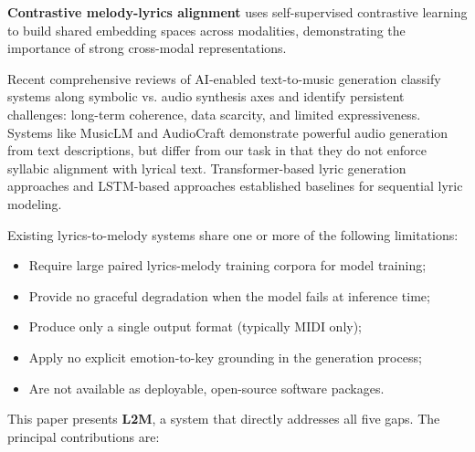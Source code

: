 \documentclass[conference]{IEEEtran}
\begin{document}
\textbf{Contrastive melody-lyrics alignment} \cite{wang2025} uses
self-supervised contrastive learning to build shared embedding spaces across
modalities, demonstrating the importance of strong cross-modal representations.

Recent comprehensive reviews of AI-enabled text-to-music generation \cite{li2025}
classify systems along symbolic vs. audio synthesis axes and identify persistent
challenges: long-term coherence, data scarcity, and limited expressiveness.
Systems like MusicLM and AudioCraft demonstrate powerful audio generation from
text descriptions, but differ from our task in that they do not enforce
syllabic alignment with lyrical text. Transformer-based lyric generation
approaches \cite{mediakov2024} and LSTM-based approaches \cite{gill2020}
established baselines for sequential lyric modeling.

Existing lyrics-to-melody systems share one or more of the following
limitations:

\begin{itemize}
  \item Require large paired lyrics-melody training corpora for model training;
  \item Provide no graceful degradation when the model fails at inference time;
  \item Produce only a single output format (typically MIDI only);
  \item Apply no explicit emotion-to-key grounding in the generation process;
  \item Are not available as deployable, open-source software packages.
\end{itemize}

This paper presents \textbf{L2M}, a system that directly addresses all five
gaps. The principal contributions are:
\end{document}
